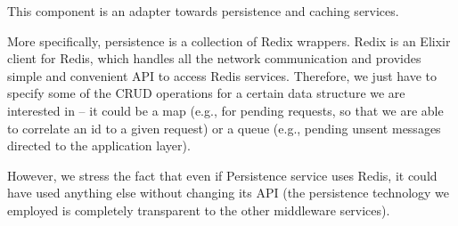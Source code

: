 
This component is an adapter towards persistence and caching services.

More specifically, persistence is a collection of Redix wrappers. Redix is an
Elixir client for Redis, which handles all the network communication and
provides simple and convenient API to access Redis services.
Therefore, we just have to specify some of the CRUD operations for a certain
data structure we are interested in -- it could be a map (e.g., for pending
requests, so that we are able to correlate an id to a given request) or a
queue (e.g., pending unsent messages directed to the application layer).

However, we stress the fact that even if Persistence service uses Redis, it
could have used anything else without changing its API (the persistence
technology we employed is completely transparent to the other middleware
services).
